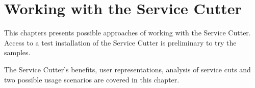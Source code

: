 \chapter{Working with the Service Cutter} 

This chapters presents possible approaches of working with the Service Cutter. Access to a test installation of the Service Cutter is preliminary to try the samples.

The Service Cutter's benefits, user representations, analysis of service cuts and two possible usage scenarios are covered in this chapter.


